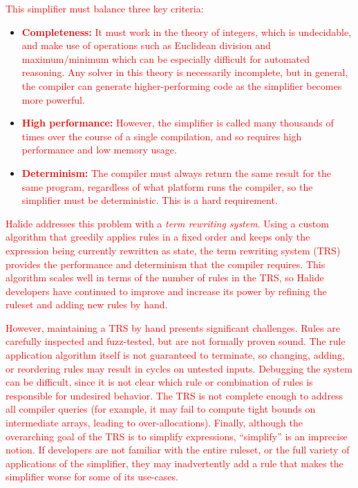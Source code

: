 \documentclass[acmsmall,review]{acmart}\settopmatter{printfolios=true,printccs=false,printacmref=false}
\newcommand{\modified}[1]{\textcolor{red}{{#1}}}
\begin{document}
\modified{This simplifier must balance three key criteria:}

\begin{itemize}
  \item \modified{\textbf{Completeness:}
It must work in 
the theory of integers, which is undecidable, and make use of operations such as 
Euclidean division and maximum/minimum which can be especially difficult for 
automated reasoning. Any solver in this theory is necessarily incomplete, but in general, 
the compiler can generate higher-performing code as the simplifier becomes more powerful.}
  \item \modified{\textbf{High performance:} However, the simplifier is called many thousands of 
times over the course of a single compilation, and so requires high performance and low memory usage. }
  \item \modified{\textbf{Determinism:} The compiler must always return the same 
result for the same program, regardless of what platform runs the compiler, 
so the simplifier must be deterministic. This is a hard requirement.}
\end{itemize}


\modified{Halide addresses this problem with a \emph{term rewriting system}. Using a custom algorithm 
that greedily applies rules in a fixed order and keeps only the expression being currently 
rewritten as state, the term rewriting system (TRS) provides the performance and determinism 
that the compiler requires. This algorithm scales well in terms of the number of rules
in the TRS, so Halide developers have continued to improve and increase its
power by refining the ruleset and adding new rules by hand.}

\modified{However, maintaining a TRS by hand presents significant challenges. Rules are 
carefully inspected and fuzz-tested, but are not formally proven sound. The 
rule application algorithm itself is not guaranteed to terminate, so changing, adding, or 
reordering rules may result in cycles on untested inputs. Debugging the system can be 
difficult, since it is not clear which rule or combination of rules is responsible for 
undesired behavior. The TRS is not complete enough to address all compiler queries 
(for example, it may fail to compute tight bounds on intermediate arrays, leading to over-allocations).
Finally, although the overarching goal of the TRS is to simplify 
expressions, ``simplify'' is an imprecise notion. If developers are not familiar with 
the entire ruleset, or the full variety of applications of the simplifier, they may inadvertently 
add a rule that makes the simplifier worse for some of its use-cases. }
\end{document}

